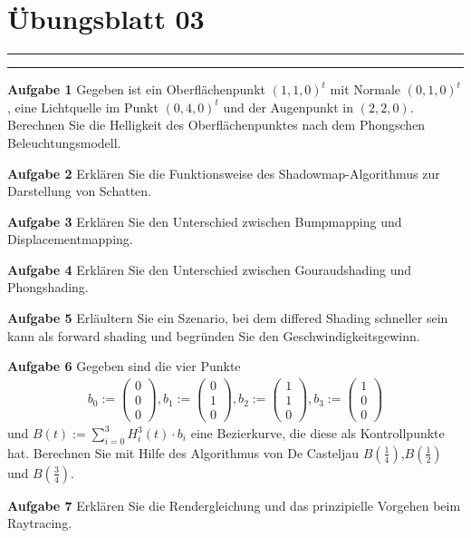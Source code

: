 \documentclass[a4paper,13pt]{scrartcl}
\begin{document}
\section*{\large  \"Ubungsblatt 03}
\hrule
\hrule
\vspace{4mm}
{\bf Aufgabe 1}
Gegeben ist ein Oberfl\"achenpunkt $(1,1,0)^t$ mit Normale $(0,1,0)^t$, eine Lichtquelle im Punkt $(0,4,0)^t$ und der Augenpunkt in $(2,2,0)$.
Berechnen Sie die Helligkeit des  Oberfl\"achenpunktes nach dem Phongschen Beleuchtungsmodell.

\vspace{8mm}
{\bf Aufgabe 2}
Erkl\"aren Sie die Funktionsweise des Shadowmap-Algorithmus zur Darstellung von Schatten.

\vspace{8mm}
{\bf Aufgabe 3}
Erkl\"aren Sie den  Unterschied zwischen Bumpmapping und Displacementmapping.

\vspace{8mm}
{\bf Aufgabe 4}
Erkl\"aren Sie  den Unterschied zwischen Gouraudshading und Phongshading.


\vspace{8mm}
{\bf Aufgabe 5}
Erl\"aultern Sie ein Szenario, bei dem differed Shading schneller sein kann als forward shading und 
 begr\"unden Sie den Geschwindigkeitsgewinn. 

{\bf Aufgabe 6}
Gegeben sind die vier Punkte 
\begin{align*}b_0 := \begin{pmatrix} 0 \\ 0 \\ 0\end{pmatrix}, b_1 :=\begin{pmatrix} 0 \\ 1 \\ 0\end{pmatrix}, b_2 :=\begin{pmatrix} 1 \\ 1 \\ 0\end{pmatrix}, 
b_3 :=\begin{pmatrix} 1 \\ 0 \\ 0\end{pmatrix} 
\end{align*}
und $B(t):=\sum_{i= 0}^{3} H^3_i(t) \cdot b_i $ eine Bezierkurve, die diese als Kontrollpunkte hat. Berechnen Sie mit Hilfe des Algorithmus von De Casteljau
$B(\frac{1}{4})$,$B(\frac{1}{2})$ und $B(\frac{3}{4})$.
 

\vspace{8mm}
{\bf Aufgabe 7}
Erkl\"aren Sie die Rendergleichung und das prinzipielle Vorgehen beim Raytracing.
\end{document}
